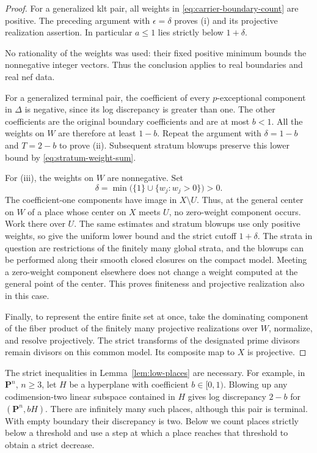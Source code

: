\begin{proof}
For a generalized klt pair, all weights in
\eqref{eq:carrier-boundary-count} are positive.  The preceding
argument with $\epsilon=\delta$ proves \textup{(i)} and its projective
realization assertion.  In particular $a\leq1$ lies strictly below
$1+\delta$.

No rationality of the weights was used: their fixed positive minimum
bounds the nonnegative integer vectors.  Thus the conclusion applies
to real boundaries and real nef data.

For a generalized terminal pair, the coefficient of every
$p$-exceptional component in $\Delta$ is negative, since its
log discrepancy is greater than one.  The other coefficients are
the original boundary coefficients and are at most $b<1$.
All the weights on $W$ are therefore at least $1-b$.
Repeat the argument with $\delta=1-b$ and $T=2-b$ to prove
\textup{(ii)}.  Subsequent stratum blowups preserve this lower bound
by \eqref{eq:stratum-weight-sum}.

For \textup{(iii)}, the weights on $W$ are nonnegative.  Set
\[
 \delta=\min\bigl(\{1\}\cup\{w_j:w_j>0\}\bigr)>0.
\]
The coefficient-one components have image in $X\setminus U$.
Thus, at the general center on $W$ of a place whose center on $X$
meets $U$, no zero-weight component occurs.  Work there over $U$.
The same estimates and stratum blowups use only positive weights,
so give the uniform lower bound and the strict cutoff $1+\delta$.
The strata in question are restrictions of the finitely many global
strata, and the blowups can be performed along their smooth closed
closures on the compact model.  Meeting a zero-weight component
elsewhere does not change a weight computed at the general point
of the center.  This proves finiteness and projective realization
also in this case.

Finally, to represent the entire finite set at once, take the
dominating component of the fiber product of the finitely many
projective realizations over $W$, normalize, and resolve projectively.
The strict transforms of the designated prime divisors remain
divisors on this common model.  Its composite map to $X$ is projective.
\end{proof}

\begin{remark}\label{rem:strict-low-cutoff}
The strict inequalities in Lemma~\ref{lem:low-places} are necessary.
For example, in $\mathbf P^n$, $n\geq3$, let $H$ be a hyperplane
with coefficient $b\in[0,1)$.  Blowing up any codimension-two linear
subspace contained in $H$ gives log discrepancy $2-b$ for
$(\mathbf P^n,bH)$.  There are infinitely many such places, although
this pair is terminal.  With empty boundary their discrepancy is two.
Below we count places strictly below a threshold and use a step at
which a place reaches that threshold to obtain a strict decrease.
\end{remark}



